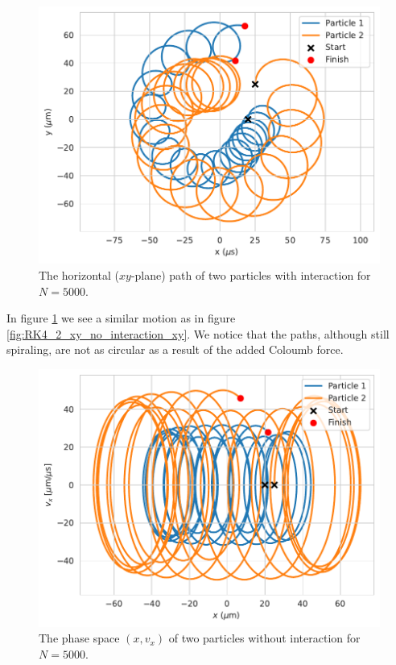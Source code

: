 \documentclass[english,notitlepage,reprint,nofootinbib]{revtex4-1}  %
\begin{document}
\begin{figure}[H]
    \centering
    \includegraphics[width=.5\textwidth]{../figures/2p_N5000_RK4_xy_interaction.pdf}
    \caption{The horizontal ($xy$-plane) path of two particles with interaction for $N = 5000$.}
    \label{fig:RK4_2_xy_with_interaction_xy}
\end{figure}

In figure \ref{fig:RK4_2_xy_with_interaction_xy} we see a similar motion as in figure \ref{fig:RK4_2_xy_no_interaction_xy}. We notice that the paths, although still spiraling, are not as circular as a result of the added Coloumb force.


\begin{figure}[H]
    \centering
    \includegraphics[width=.5\textwidth]{../figures/phase_space_x_RK4_N5000.pdf}
    \caption{The phase space $(x, v_x)$ of two particles without interaction for $N = 5000$.}
    \label{fig:RK4_2_x_phasespace_no_interaction_phasespace_xy}
\end{figure}
\end{document}
